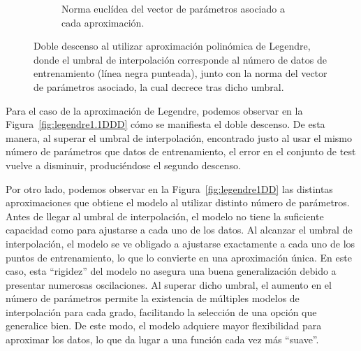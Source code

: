 \begin{figure}[h]
\begin{subfigure}[b]{0.48\textwidth}
        \caption{Norma euclídea del vector de parámetros asociado a cada aproximación.}\label{fig:legendre1.2DDD}
    \end{subfigure}
    \caption[Doble descenso al utilizar aproximación polinómica de Legendre y norma del vector de parámetros.]{Doble descenso al utilizar aproximación polinómica de Legendre, donde el umbral de interpolación corresponde al número de datos de entrenamiento (línea negra punteada), junto con la norma del vector de parámetros asociado, la cual decrece tras dicho umbral.}\label{fig:legendre1DDD}
\end{figure}

Para el caso de la aproximación de Legendre, podemos observar en la Figura~\ref{fig:legendre1.1DDD} cómo se manifiesta el doble descenso. De esta manera, al superar el umbral de interpolación, encontrado justo al usar el mismo número de parámetros que datos de entrenamiento, el error en el conjunto de test vuelve a disminuir, produciéndose el segundo descenso.

Por otro lado, podemos observar en la Figura~\ref{fig:legendre1DD} las distintas aproximaciones que obtiene el modelo al utilizar distinto número de parámetros. Antes de llegar al umbral de interpolación, el modelo no tiene la suficiente capacidad como para ajustarse a cada uno de los datos. Al alcanzar el umbral de interpolación, el modelo se ve obligado a ajustarse exactamente a cada uno de los puntos de entrenamiento, lo que lo convierte en una aproximación única. En este caso, esta ``rigidez'' del modelo no asegura una buena generalización debido a presentar numerosas oscilaciones. Al superar dicho umbral, el aumento en el número de parámetros permite la existencia de múltiples modelos de interpolación para cada grado, facilitando la selección de una opción que generalice bien. De este modo, el modelo adquiere mayor flexibilidad para aproximar los datos, lo que da lugar a una función cada vez más ``suave''.

